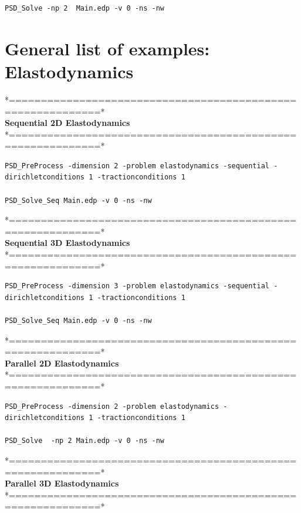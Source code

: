 {{\begin{lstlisting}[style=BashInputStyle]
PSD_Solve -np 2  Main.edp -v 0 -ns -nw   	
\end{lstlisting}

\section{General list of examples: Elastodynamics}

*============================================================*\\
\textbf{ Sequential 2D Elastodynamics}  \\                    
*============================================================*\\

\begin{lstlisting}[style=BashInputStyle]
PSD_PreProcess -dimension 2 -problem elastodynamics -sequential -dirichletconditions 1 -tractionconditions 1 

PSD_Solve_Seq Main.edp -v 0 -ns -nw
\end{lstlisting}
*============================================================*\\
\textbf{ Sequential 3D Elastodynamics}  \\                    
*============================================================*\\

\begin{lstlisting}[style=BashInputStyle]
PSD_PreProcess -dimension 3 -problem elastodynamics -sequential -dirichletconditions 1 -tractionconditions 1 

PSD_Solve_Seq Main.edp -v 0 -ns -nw
\end{lstlisting}
*============================================================*\\
\textbf{ Parallel 2D Elastodynamics}   \\                   
*============================================================*\\

\begin{lstlisting}[style=BashInputStyle]
PSD_PreProcess -dimension 2 -problem elastodynamics -dirichletconditions 1 -tractionconditions 1 

PSD_Solve  -np 2 Main.edp -v 0 -ns -nw
\end{lstlisting}
*============================================================*\\
\textbf{ Parallel 3D Elastodynamics } \\                    
*============================================================*\\

}}
